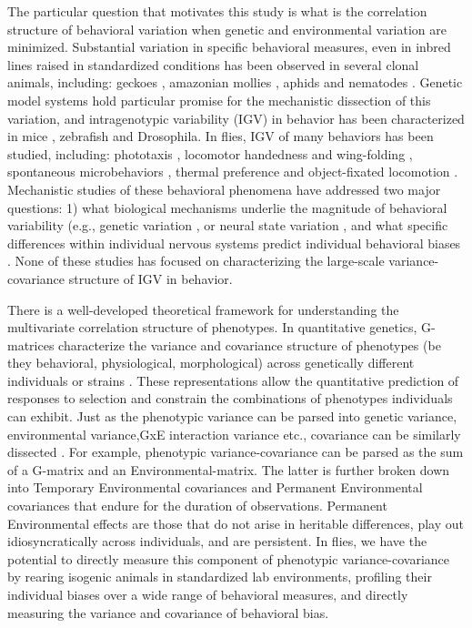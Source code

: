 \documentclass[12pt,letterpaper]{article}
\begin{document}
The particular question that motivates this study is what is the correlation structure of behavioral variation when genetic and environmental variation are minimized. Substantial variation in specific behavioral measures, even in inbred lines raised in standardized conditions has been observed in several clonal animals, including: geckoes \cite{sakai_jetho_2018}, amazonian mollies \cite{Bierbach_Behavioural_2017}, aphids and nematodes \cite{Schuett_Personality_2011,Stern_Neuromodulatory_2017}. Genetic model systems hold particular promise for the mechanistic dissection of this variation, and intragenotypic variability (IGV) in behavior has been characterized in mice \cite{Freund_Emergence_2013}, zebrafish \cite{Pantoja_Neuromodulatory_2016} and Drosophila. In flies, IGV of many behaviors has been studied, including: phototaxis \cite{Kain_Phototactic_2012}, locomotor handedness and wing-folding \cite{Buchanan_Neuronal_2015}, spontaneous microbehaviors \cite{Kain_Leg_2013,Todd_Systematic_2017}, thermal preference \cite{Kain_Variability_2015} and object-fixated locomotion \cite{Linneweber_A_2019}. Mechanistic studies of these behavioral phenomena have addressed two major questions: 1) what biological mechanisms underlie the magnitude of behavioral variability (e.g., genetic variation \cite{Ayroles_Behavioral_2015}, or neural state variation \cite{Kain_Phototactic_2012,Buchanan_Neuronal_2015}, and what specific differences within individual nervous systems predict individual behavioral biases \cite{Linneweber_A_2019}. None of these studies has focused on characterizing the large-scale variance-covariance structure of IGV in behavior. 

There is a well-developed theoretical framework for understanding the multivariate correlation structure of phenotypes. In quantitative genetics, G-matrices characterize the variance and covariance structure of phenotypes (be they behavioral, physiological, morphological) across genetically different individuals or strains \cite{Lynch_Genetics_1998}. These representations allow the quantitative prediction of responses to selection and constrain the combinations of phenotypes individuals can exhibit. Just as the phenotypic variance can be parsed into genetic variance, environmental variance,GxE interaction variance etc., covariance can be similarly dissected \cite{Charmantier_Quantitative_2014,Berdal_Adaptive_2019}. For example, phenotypic variance-covariance can be parsed as the sum of a G-matrix and an Environmental-matrix. The latter is further broken down into Temporary Environmental covariances and Permanent Environmental covariances that endure for the duration of observations. Permanent Environmental effects are those that do not arise in heritable differences, play out idiosyncratically across individuals, and are persistent. In flies, we have the potential to directly measure this component of phenotypic variance-covariance by rearing isogenic animals in standardized lab environments, profiling their individual biases over a wide range of behavioral measures, and directly measuring the variance and covariance of behavioral bias.
\end{document}
